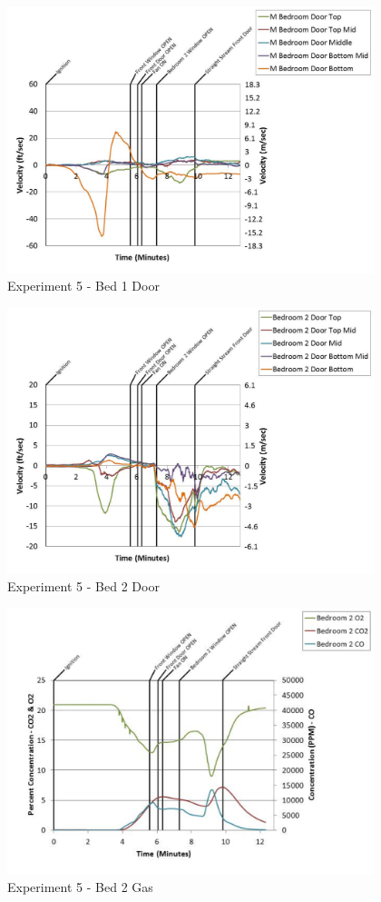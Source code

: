 \documentclass{article}
\begin{document}
\begin{appendices}
	\clearpage

	\begin{figure}[h!]
		\centering
		\includegraphics[height=3.05in]{0_Images/Results_Charts/Exp_5_Charts/Bed1Door.pdf}
		\caption{Experiment 5 - Bed 1 Door}
	\end{figure}
 

	\begin{figure}[h!]
		\centering
		\includegraphics[height=3.05in]{0_Images/Results_Charts/Exp_5_Charts/Bed2Door.pdf}
		\caption{Experiment 5 - Bed 2 Door}
	\end{figure}
 
	\clearpage

	\begin{figure}[h!]
		\centering
		\includegraphics[height=3.05in]{0_Images/Results_Charts/Exp_5_Charts/Bed2Gas.pdf}
		\caption{Experiment 5 - Bed 2 Gas}
	\end{figure}
 


\end{appendices}
\end{document}
